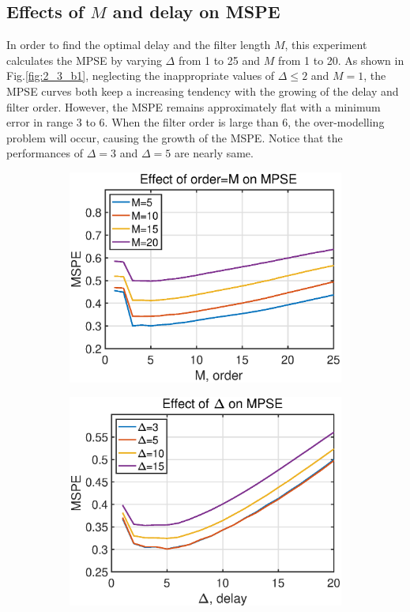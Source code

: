 \subsection{Effects of $M$ and delay on MSPE }
In order to find the optimal delay and the filter length $M$, this experiment calculates the MPSE by varying $\Delta$ from 1 to 25 and $M$ from 1 to 20. As shown in Fig.\ref{fig:2_3_b1}, neglecting the inappropriate values of $\Delta\leq 2$ and $M=1$, the MPSE curves both keep a increasing tendency with the growing of the delay and filter order. However, the MSPE remains approximately flat with a minimum error in range 3 to 6. When the filter order is large than 6, the over-modelling problem will occur, causing the growth of the MSPE. Notice that the performances of $\Delta=3$ and $\Delta=5$ are nearly same.
\begin{figure}[htb]
    \centering
    \hspace{-0.4cm}
    \begin{subfigure}[b]{0.4\textwidth}
     \centering
     \includegraphics[width=\textwidth]{fig/23/23b2.eps}
    \end{subfigure}
    \hspace{1cm}
    \begin{subfigure}[b]{0.4\textwidth}
     \centering
     \includegraphics[width=\textwidth]{fig/23/23b1.eps}

\end{subfigure}
\end{figure}
